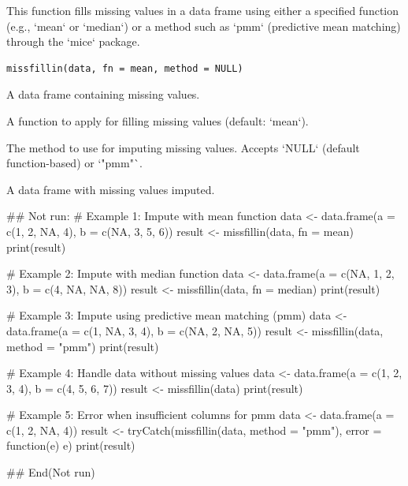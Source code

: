 \documentclass[a4paper]{book}
\begin{document}
%
\begin{Description}
This function fills missing values in a data frame using either a specified function (e.g., `mean` or `median`)
or a method such as `pmm` (predictive mean matching) through the `mice` package.
\end{Description}
%
\begin{Usage}
\begin{verbatim}
missfillin(data, fn = mean, method = NULL)
\end{verbatim}
\end{Usage}
%
\begin{Arguments}
\begin{ldescription}
\item[\code{data}] A data frame containing missing values.

\item[\code{fn}] A function to apply for filling missing values (default: `mean`).

\item[\code{method}] The method to use for imputing missing values. Accepts `NULL` (default function-based) or `"pmm"`.
\end{ldescription}
\end{Arguments}
%
\begin{Value}
A data frame with missing values imputed.
\end{Value}
%
\begin{Examples}
\begin{ExampleCode}
\#\# Not run: 
# Example 1: Impute with mean function
data <- data.frame(a = c(1, 2, NA, 4), b = c(NA, 3, 5, 6))
result <- missfillin(data, fn = mean)
print(result)

# Example 2: Impute with median function
data <- data.frame(a = c(NA, 1, 2, 3), b = c(4, NA, NA, 8))
result <- missfillin(data, fn = median)
print(result)

# Example 3: Impute using predictive mean matching (pmm)
data <- data.frame(a = c(1, NA, 3, 4), b = c(NA, 2, NA, 5))
result <- missfillin(data, method = "pmm")
print(result)

# Example 4: Handle data without missing values
data <- data.frame(a = c(1, 2, 3, 4), b = c(4, 5, 6, 7))
result <- missfillin(data)
print(result)

# Example 5: Error when insufficient columns for pmm
data <- data.frame(a = c(1, 2, NA, 4))
result <- tryCatch(missfillin(data, method = "pmm"), error = function(e) e)
print(result)

## End(Not run)
\end{ExampleCode}
\end{Examples}
\end{document}
